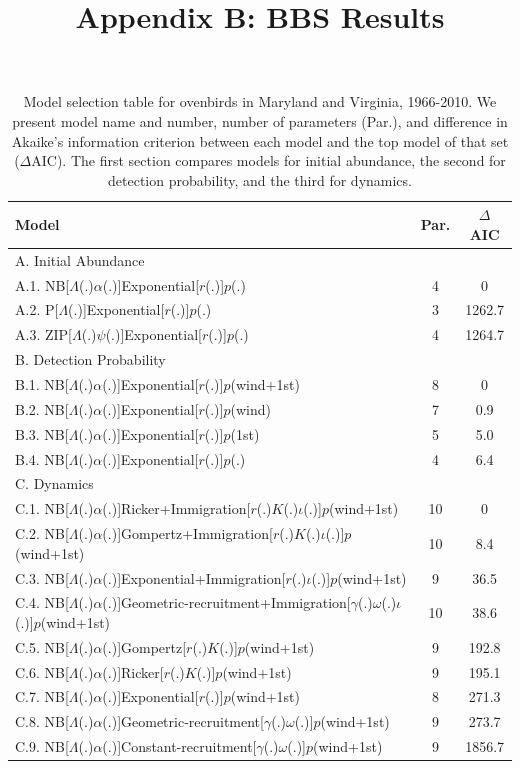 \documentclass{article}
\begin{document}
\title{Appendix B: BBS Results}
\date{} 
\maketitle
\renewcommand*\thetable{B\arabic{table}}
\renewcommand*\thefigure{B\arabic{figure}}
\begin{table}[htb]
  \centering
  \small
\caption{Model selection table for ovenbirds in Maryland and Virginia,
    1966-2010.  We present model name and number, number of 
parameters (Par.), and difference in Akaike's
information criterion between each model and the top model of
that set ($\Delta$AIC).  The first section compares
models for initial abundance, the second for detection
probability, and the third for dynamics.}
  \begin{tabular}[h]{lcc}
\hline
Model	&Par.	&$\Delta$AIC	\\
\hline
A. Initial Abundance && \\
A.1. NB[$\Lambda$(.)$\alpha$(.)]Exponential[$r$(.)]$p$(.)	&4	&0\\
A.2. P[$\Lambda$(.)]Exponential[$r$(.)]$p$(.)	&3	&1262.7\\
A.3. ZIP[$\Lambda$(.)$\psi$(.)]Exponential[$r$(.)]$p$(.)	&4 &1264.7\\
\hline
B. Detection Probability && \\
B.1. NB[$\Lambda$(.)$\alpha$(.)]Exponential[$r$(.)]$p$(wind+1st)	&8 &0	\\
B.2. NB[$\Lambda$(.)$\alpha$(.)]Exponential[$r$(.)]$p$(wind) &7 &0.9\\
B.3. NB[$\Lambda$(.)$\alpha$(.)]Exponential[$r$(.)]$p$(1st)	&5	&5.0
\\B.4. NB[$\Lambda$(.)$\alpha$(.)]Exponential[$r$(.)]$p$(.)	&4	&6.4\\
\hline
C. Dynamics && \\
C.1. NB[$\Lambda$(.)$\alpha$(.)]Ricker+Immigration[$r$(.)$K$(.)$\iota$(.)]$p$(wind+1st) &10	&0	\\
C.2. NB[$\Lambda$(.)$\alpha$(.)]Gompertz+Immigration[$r$(.)$K$(.)$\iota$(.)]$p$(wind+1st) &10	&8.4 \\
C.3. NB[$\Lambda$(.)$\alpha$(.)]Exponential+Immigration[$r$(.)$\iota$(.)]$p$(wind+1st) &9	&36.5\\
C.4. NB[$\Lambda$(.)$\alpha$(.)]Geometric-recruitment+Immigration[$\gamma$(.)$\omega$(.)$\iota$(.)]$p$(wind+1st) &10	&38.6\\
C.5. NB[$\Lambda$(.)$\alpha$(.)]Gompertz[$r$(.)$K$(.)]$p$(wind+1st) &9	&192.8\\
C.6. NB[$\Lambda$(.)$\alpha$(.)]Ricker[$r$(.)$K$(.)]$p$(wind+1st) &9	&195.1\\
C.7. NB[$\Lambda$(.)$\alpha$(.)]Exponential[$r$(.)]$p$(wind+1st)	&8 &271.3\\
C.8. NB[$\Lambda$(.)$\alpha$(.)]Geometric-recruitment[$\gamma$(.)$\omega$(.)]$p$(wind+1st) &9	&273.7\\
C.9. NB[$\Lambda$(.)$\alpha$(.)]Constant-recruitment[$\gamma$(.)$\omega$(.)]$p$(wind+1st) &9	&1856.7\\
\hline
\end{tabular}
\end{table}
\clearpage
\end{document}
